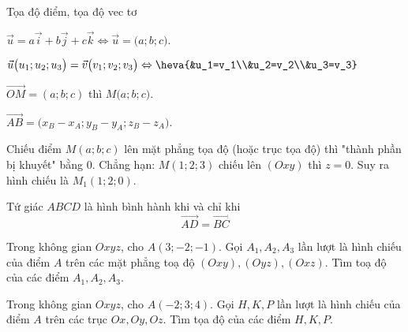 \begin{dang}{Tọa độ điểm, tọa độ vec tơ}
	\begin{listEX}[2]
		\item [\ding{172}] $\vec{u}=a\vec{i}+b\vec{j}+c\vec{k} \Leftrightarrow \vec{u}=\big(a;b;c\big)$.
		\item [\ding{173}] $\vec{u}\big(u_1;u_2;u_3\big)=\vec{v}\big(v_1;v_2;v_3\big) \Leftrightarrow \heva{&u_1=v_1\\&u_2=v_2\\&u_3=v_3}$
		\item [\ding{174}] $\vec{OM}=(a;b;c)$ thì $M\big(a;b;c\big)$.
		\item [\ding{175}] $\vec{AB}=\big(x_B-x_A;y_B-y_A;z_B-z_A \big).$
		\item [\ding{176}] Chiếu điểm $M(a;b;c)$ lên mặt phẳng tọa độ (hoặc trục tọa độ) thì "thành phần bị khuyết" bằng $0$. Chẳng hạn: $M(1;2;3)$ chiếu lên $(Oxy)$ thì $z=0$. Suy ra hình chiếu là $M_1(1;2;0)$.
		\item [\ding{177}] Tứ giác $ABCD$ là hình bình hành khi và chỉ khi $$\vec{AD}=\vec{BC}$$
	\end{listEX}
\end{dang}
\BTTL
\begin{vd}
	Trong không gian $Oxyz$, cho $A(3 ;-2 ;-1)$. Gọi $ A_1, A_2, A_3$ lần lượt là hình chiếu của điểm $A$ trên các mặt phẳng toạ độ $(Oxy),(Oyz),(Oxz)$. Tìm toạ độ của các điểm $ A_1, A_2, A_3$.
\end{vd}
\begin{vd}
	Trong không gian $Oxyz$, cho $A(-2;3;4)$. Gọi $H, K, P$ lần lượt là hình chiếu của điểm $A$ trên các trục $Ox, Oy, Oz$. Tìm tọa độ của các điểm $H,K,P$.
\end{vd}
